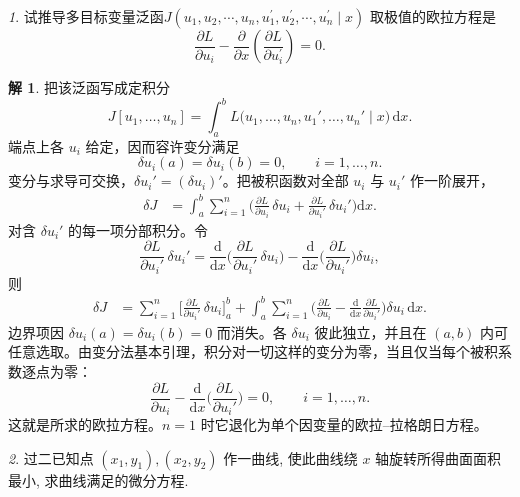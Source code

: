 \documentclass[11pt]{article}
\theoremstyle{remark}
\newtheorem{problem}{}
\theoremstyle{definition}
\newtheorem{solution}{解}
\begin{document}
\renewcommand{\labelenumi}{(\arabic{enumi})}
\renewcommand{\labelenumii}{(\arabic{enumi}.\arabic{enumii})}

\begin{problem}
  试推导多目标变量泛函$J\left(u_1, u_2, \cdots, u_n, u_1^{\prime}, u_2^{\prime}, \cdots, u_n^{\prime} \mid x\right)$
  取极值的欧拉方程是
  $$
  \frac{\partial L}{\partial u_i}-\frac{\partial}{\partial x}\left(\frac{\partial L}{\partial u_i^{\prime}}\right)=0 .
  $$
\end{problem}

\begin{solution}
把该泛函写成定积分
\[
J[u_1,\ldots,u_n]
=\int_a^b L\bigl(u_1,\ldots,u_n,u_1',\ldots,u_n'\mid x\bigr)\,\mathrm{d}x.
\]
端点上各 $u_i$ 给定，因而容许变分满足
\[
\delta u_i(a)=\delta u_i(b)=0,\qquad i=1,\ldots,n.
\]
变分与求导可交换，$\delta u_i'=(\delta u_i)'$。把被积函数对全部 $u_i$ 与 $u_i'$ 作一阶展开，
\begin{align*}
\delta J
&=\int_a^b\sum_{i=1}^n
\Biggl(
\frac{\partial L}{\partial u_i}\,\delta u_i
+\frac{\partial L}{\partial u_i'}\,\delta u_i'
\Biggr)\mathrm{d}x.
\end{align*}
对含 $\delta u_i'$ 的每一项分部积分。令
\[
\frac{\partial L}{\partial u_i'}\,\delta u_i'
=\frac{\mathrm{d}}{\mathrm{d}x}\Biggl(\frac{\partial L}{\partial u_i'}\,\delta u_i\Biggr)
-\frac{\mathrm{d}}{\mathrm{d}x}\Biggl(\frac{\partial L}{\partial u_i'}\Biggr)\delta u_i,
\]
则
\begin{align*}
\delta J
&=\sum_{i=1}^n
\Biggl[
\frac{\partial L}{\partial u_i'}\,\delta u_i
\Biggr]_a^b
+\int_a^b\sum_{i=1}^n
\Biggl(
\frac{\partial L}{\partial u_i}
-\frac{\mathrm{d}}{\mathrm{d}x}\frac{\partial L}{\partial u_i'}
\Biggr)\delta u_i\,\mathrm{d}x.
\end{align*}
边界项因 $\delta u_i(a)=\delta u_i(b)=0$ 而消失。各 $\delta u_i$ 彼此独立，并且在 $(a,b)$ 内可任意选取。由变分法基本引理，积分对一切这样的变分为零，当且仅当每个被积系数逐点为零：
\[
\frac{\partial L}{\partial u_i}
-\frac{\mathrm{d}}{\mathrm{d}x}\Biggl(\frac{\partial L}{\partial u_i'}\Biggr)
=0,
\qquad i=1,\ldots,n.
\]
这就是所求的欧拉方程。$n=1$ 时它退化为单个因变量的欧拉--拉格朗日方程。
\end{solution}

\begin{problem}
  过二已知点 $\left(x_1, y_1\right),\left(x_2, y_2\right)$ 作一曲线, 使此曲线绕 $x$ 轴旋转所得曲面面积最小, 求曲线满足的微分方程.
\end{problem}
\end{document}
